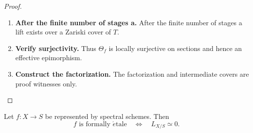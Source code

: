 \begin{proof}
\begin{enumerate}[label=\textup{(\arabic*)}]
    \item \textbf{After the finite number of stages a.}
    After the finite number of stages a lift exists over a Zariski cover of \(T\).

    \item \textbf{Verify surjectivity.}
    Thus \(\Theta_f\) is locally surjective on sections and hence an effective epimorphism.

    \item \textbf{Construct the factorization.}
    The factorization and intermediate covers are proof witnesses only.
\end{enumerate}
\end{proof}

\begin{theorem}
\label{thm:cotangent-recognition-formal-etale}
Let \(f:X\to S\) be represented by spectral schemes. Then
\[
    f\text{ is formally }\acute{e}\text{tale}
    \quad\Longleftrightarrow\quad
    L_{X/S}\simeq0.
\]
\end{theorem}

